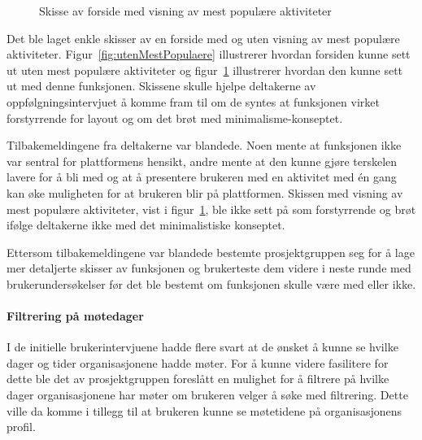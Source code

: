 \begin{figure}[H]
\caption{Skisse av forside med visning av mest populære aktiviteter}
\label{fig:medMestPopulaere}
\end{figure}

Det ble laget enkle skisser av en forside med og uten visning av mest populære aktiviteter. Figur~\ref{fig:utenMestPopulaere} illustrerer hvordan forsiden kunne sett ut uten mest populære aktiviteter og figur~\ref{fig:medMestPopulaere} illustrerer hvordan den kunne sett ut med denne funksjonen. Skissene skulle hjelpe deltakerne av oppfølgningsintervjuet å komme fram til om de syntes at funksjonen virket forstyrrende for layout og om det brøt med minimalisme-konseptet.

Tilbakemeldingene fra deltakerne var blandede. Noen mente at funksjonen ikke var sentral for plattformens hensikt, andre mente at den kunne gjøre terskelen lavere for å bli med og at å presentere brukeren med en aktivitet med én gang kan øke muligheten for at brukeren blir på plattformen. Skissen med visning av mest populære aktiviteter, vist i figur~\ref{fig:medMestPopulaere}, ble ikke sett på som forstyrrende og brøt ifølge deltakerne ikke med det minimalistiske konseptet. 

Ettersom tilbakemeldingene var blandede bestemte prosjektgruppen seg for å lage mer detaljerte skisser av funksjonen og brukerteste dem videre i neste runde med brukerundersøkelser før det ble bestemt om funksjonen skulle være med eller ikke.

\paragraph{Filtrering på møtedager}
I de initielle brukerintervjuene hadde flere svart at de ønsket å kunne se hvilke dager og tider organisasjonene hadde møter. For å kunne videre fasilitere for dette ble det av prosjektgruppen foreslått en mulighet for å filtrere på hvilke dager organisasjonene har møter om brukeren velger å søke med filtrering. Dette ville da komme i tillegg til at brukeren kunne se møtetidene på organisasjonens profil. 

